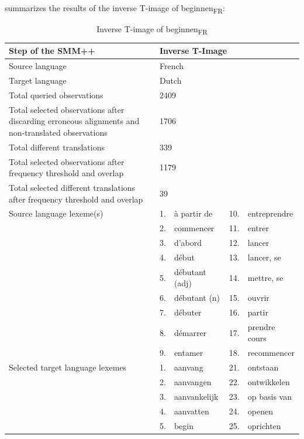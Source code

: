 summarizes the results of the inverse T-image of beginnen\textsubscript{FR}:

\begin{table}
\caption{Inverse T-image of beginnen\textsubscript{FR}\label{tab:3:9}}
\small
\begin{tabularx}{\textwidth}{p{}lXlX}
\lsptoprule
Step of the SMM++ & \multicolumn{4}{l}{Inverse T-Image}\\ \midrule
\rowcolor{lsLightGray} Source language & \multicolumn{4}{l}{French}\\
Target language & \multicolumn{4}{l}{Dutch}\\
\rowcolor{lsLightGray} Total queried observations & \multicolumn{4}{l}{ 2409}\\
Total selected observations after discarding erroneous alignments and non-translated observations & \multicolumn{4}{l}{ 1706}\\
\rowcolor{lsLightGray} Total different translations & \multicolumn{4}{l}{ 339}\\
Total selected observations after frequency threshold and overlap & \multicolumn{4}{l}{ 1179}\\
\rowcolor{lsLightGray} Total selected different translations after frequency threshold and overlap & \multicolumn{4}{l}{ 39}\\
Source language lexeme(s) & 1.& à partir de & 10.& entreprendre\\
& 2.& commencer & 11.& entrer\\
& 3.& d'abord & 12.& lancer\\
& 4.& début & 13.& lancer, se\\
& 5.& débutant (adj) & 14.& mettre, se\\
& 6.& débutant (n) & 15.& ouvrir\\
& 7.& débuter & 16.& partir\\
& 8.& démarrer & 17.& prendre cours\\
& 9.& entamer & 18.& recommencer \\
\rowcolor{lsLightGray} Selected target language lexemes & 1. & aanvang & 21.& ontstaan\\
\rowcolor{lsLightGray}& 2.& aanvangen & 22.& ontwikkelen\\
\rowcolor{lsLightGray}& 3.& aanvankelijk & 23.& op basis van\\
\rowcolor{lsLightGray}& 4.& aanvatten & 24.& openen\\
\rowcolor{lsLightGray}& 5.& begin & 25.& oprichten\\

\end{tabularx}
\end{table}
